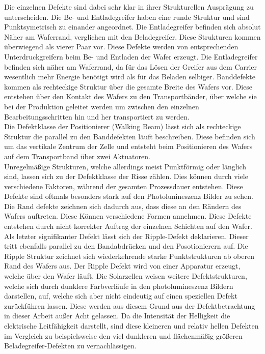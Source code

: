   Die einzelnen Defekte sind dabei sehr klar in ihrer Strukturellen Ausprägung zu unterscheiden. 
  Die Be- und Entladegreifer haben eine runde Struktur und sind Punktsymetrisch zu einander angeordnet. Die Entladegreifer befinden sich absolut Näher am Waferrand, verglichen mit den Beladegreifer. Diese Strukturen kommen überwiegend als vierer Paar vor. Diese Defekte werden von entsprechenden Unterdruckgreifern beim Be- und Entladen der Wafer erzeugt. Die Entladegreifer befinden sich näher am Waferrand, da für das Lösen der Greifer aus dem Carrier wesentlich mehr Energie benötigt wird als für das Beladen selbiger.
  Banddefekte kommen als rechteckige Struktur über die gesamte Breite des Wafers vor. Diese entstehen über den Kontakt des Wafers zu den Transportbänder, über welche sie bei der Produktion geleitet werden um zwischen den einzelnen Bearbeitungsschritten hin und her transportiert zu werden.\\
  Die Defektklasse der Positionierer (Walking Beam) lässt sich als rechteckige Struktur die parallel zu den Banddefekten läuft beschreiben. Diese befinden sich um das vertikale Zentrum der Zelle und entsteht beim Positionieren des Wafers auf dem Transportband über zwei Aktuatoren. \\
  Unregelmäßige Strukturen, welche allerdings meist Punktförmig oder länglich sind, lassen sich zu der Defektklasse der Risse zählen. Dies können durch viele verschiedene Faktoren, während der gesamten Prozessdauer entstehen. Diese Defekte sind oftmals besonders stark auf den Photolunineszenz Bilder zu sehen. \\
  Die Rand defekte zeichnen sich dadurch aus, dass diese an den Rändern des Wafers auftreten. Diese Können verschiedene Formen annehmen. Diese Defekte entstehen durch nicht korrekter Auftrag der einzelnen Schichten auf den Wafer. 
  Als letzter signifikanter Defekt lässt sich der Ripple-Defekt deklarieren. Dieser tritt ebenfalls parallel zu den Bandabdrücken und den Posotionierern auf. Die Ripple Struktur zeichnet sich wiederkehrende starke Punktstrukturen ab oberen Rand des Wafers aus. Der Ripple Defekt wird von einer Apparatur erzeugt, welche über den Wafer läuft. 
  Die Solarzellen weisen weitere Defektstrukturen, welche sich durch dunklere Farbverläufe in den photolumineszenz Bildern darstellen, auf, welche sich aber nicht eindeutig auf einen speziellen Defekt zurückführen lassen. Diese werden aus diesem Grund aus der Defektbetrachtung in dieser Arbeit außer Acht gelassen. 
  Da die Intensität der Helligkeit die elektrische Leitfähigkeit darstellt, sind diese kleineren und relativ hellen Defekten im Vergleich zu beispielsweise den viel dunkleren und flächenmäßig größeren Beladegreifer-Defekten zu vernachlässigen.  



